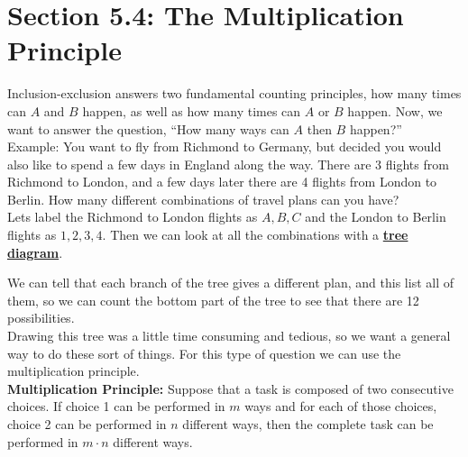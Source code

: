 \documentclass[14,fleqn]{article}
\newcommand{\defn}[1]{\textbf{\underline{#1}}}
\begin{document}
\section{Section 5.4: The Multiplication Principle}

Inclusion-exclusion answers two fundamental counting principles, how many times can $A$ and $B$ happen, as well as how many times can $A$ or $B$ happen. Now, we want to answer the question, ``How many ways can $A$ then $B$ happen?''\\

Example: You want to fly from Richmond to Germany, but decided you would also like to spend a few days in England along the way. There are 3 flights from Richmond to London, and a few days later there are 4 flights from London to Berlin. How many different combinations of travel plans can you have?\\
Lets label the Richmond to London flights as $A,B,C$ and the London to Berlin flights as $1,2,3,4.$ Then we can look at all the combinations with a \defn{tree diagram}.

We can tell that each branch of the tree gives a different plan, and this list all of them, so we can count the bottom part of the tree to see that there are 12 possibilities. \\

Drawing this tree was a little time consuming and tedious, so we want a general way to do these sort of things. For this type of question we can use the multiplication principle.\\
\textbf{Multiplication Principle:} Suppose that a task is composed of two consecutive choices. If choice 1 can be performed in $m$ ways and for each of those choices, choice 2 can be performed in $n$ different ways, then the complete task can be performed in $m\cdot n$ different ways.\\
\end{document}
